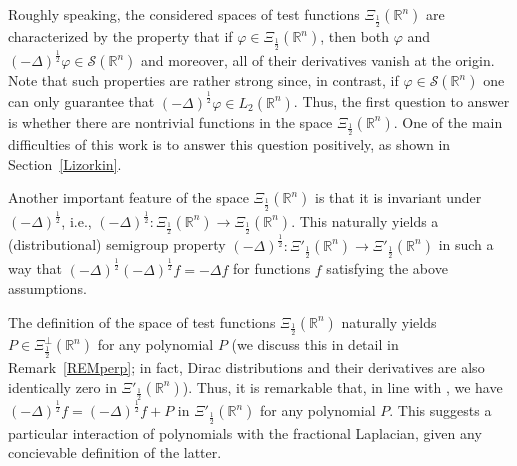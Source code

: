 \documentclass[reqno,11pt]{amsart}
\theoremstyle{definition}
\def\R{\mathbb{R}}
\begin{document}
Roughly speaking, the considered spaces of test functions $\Xi_\frac{1}{2}(\R^n)$ are characterized by the property that if $\varphi\in\Xi_\frac{1}{2}(\R^n)$, then both $\varphi$ and $(-\Delta)^\frac{1}{2}\varphi\in \mathcal{S}(\R^n)$ and moreover, all of their derivatives vanish at the origin. Note that such properties are rather strong since, in contrast, if $\varphi\in \mathcal{S}(\R^n)$ one can only guarantee that $(-\Delta)^\frac{1}{2} \varphi\in L_2(\R^n)$. Thus, the first question to answer is whether there are nontrivial functions in the space $\Xi_\frac{1}{2}(\R^n)$. One of the main difficulties of this work is to answer this question positively, as shown in Section~\ref{Lizorkin}.


Another important feature of the space $\Xi_\frac{1}{2}(\R^n)$ is that it is invariant under $(-\Delta)^\frac{1}{2}$, i.e., $(-\Delta)^\frac{1}{2}:\Xi_\frac{1}{2}(\R^n)\to \Xi_{\frac{1}{2}}(\R^n)$. This naturally yields a (distributional) semigroup property $(-\Delta)^\frac{1}{2}:\Xi'_\frac{1}{2}(\R^n)\to \Xi'_{\frac{1}{2}}(\R^n)$ in such a way that $(-\Delta)^\frac{1}{2}(-\Delta)^\frac{1}{2}f=-\Delta f$ for functions $f$ satisfying the above assumptions.

The definition of the space of test functions $\Xi_{\frac{1}{2}}(\R^n)$ naturally yields $P\in \Xi^\perp_{\frac{1}{2}}(\R^n) $ for any polynomial $P$ (we discuss this in detail in Remark~\ref{REMperp}; in fact, Dirac distributions and their derivatives are also identically zero in $\Xi'_\frac{1}{2}(\R^n)$). Thus, it is remarkable that, in line with \cite{POTENZEVALDIN}, we have $(-\Delta)^\frac{1}{2} f = (-\Delta)^\frac{1}{2} f + P$ in $\Xi'_\frac{1}{2}(\R^n)$ for any polynomial $P$. This suggests a particular interaction of polynomials with the fractional Laplacian, given any concievable definition of the latter.



\medskip
\end{document}
